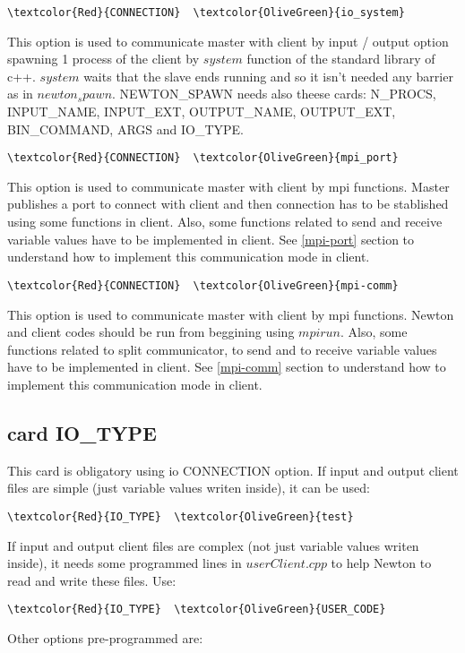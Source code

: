 \begin{Verbatim}[frame=single,commandchars=\\\{\}]
\textcolor{Red}{CONNECTION}  \textcolor{OliveGreen}{io_system}
\end{Verbatim}
This option is used to communicate master with client by input / output option spawning 1 process of the client by $system$ function of the standard library of c++. $system$ waits that the slave ends running and so it isn't needed any barrier as in $newton_spawn$. NEWTON_SPAWN needs also theese cards: N_PROCS, INPUT_NAME, INPUT_EXT, OUTPUT_NAME, OUTPUT_EXT, BIN_COMMAND, ARGS and IO_TYPE.

\begin{Verbatim}[frame=single,commandchars=\\\{\}]
\textcolor{Red}{CONNECTION}  \textcolor{OliveGreen}{mpi_port}
\end{Verbatim}
This option is used to communicate master with client by mpi functions. Master publishes a port to connect with client and then connection has to be stablished using some functions in client. Also, some functions related to send and receive variable values have to be implemented in client. See \ref{mpi-port} section to understand how to implement this communication mode in client.

\begin{Verbatim}[frame=single,commandchars=\\\{\}]
\textcolor{Red}{CONNECTION}  \textcolor{OliveGreen}{mpi-comm}
\end{Verbatim}
This option is used to communicate master with client by mpi functions. Newton and client codes should be run from beggining using $mpirun$. Also, some functions related to split communicator, to send and to receive variable values have to be implemented in client. See \ref{mpi-comm} section to understand how to implement this communication mode in client.

\subsection{card IO_TYPE}
This card is obligatory using io CONNECTION option.
If input and output client files are simple (just variable values writen inside), it can be used:
\begin{Verbatim}[frame=single,commandchars=\\\{\}]
\textcolor{Red}{IO_TYPE}  \textcolor{OliveGreen}{test}
\end{Verbatim}
If input and output client files are complex (not just variable values writen inside), it needs some programmed lines in $userClient.cpp$ to help Newton to read and write these files. Use:
\begin{Verbatim}[frame=single,commandchars=\\\{\}]
\textcolor{Red}{IO_TYPE}  \textcolor{OliveGreen}{USER_CODE}
\end{Verbatim}
Other options pre-programmed are:


